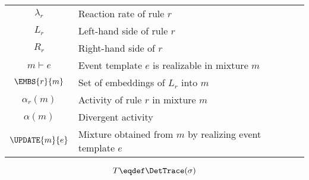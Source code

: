 
\medskip

\begin{center}
\def\arraystretch{1.5}
\begin{tabular}{cp{6cm}}
$\lambda_r$ & Reaction rate of rule $r$ \\
$L_r$ & Left-hand side of rule $r$ \\
$R_r$ & Right-hand side of $r$ \\
$m \vdash e$ & Event template $e$ is realizable in mixture $m$ \\
$\EMBS{r}{m}$ & Set of embeddings of $L_r$ into $m$ \\
$\alpha_r(m)$ & Activity of rule $r$ in mixture $m$ \\
$\alpha(m)$ & Divergent activity \\
$\UPDATE{m}{e}$ & Mixture obtained from $m$ by realizing event template $e$ \\
\end{tabular}
\end{center}


\[ T \eqdef \DetTrace(\sigma) \]

\newcommand\sbullet[1][.5]{\mathbin{\vcenter{\hbox{\scalebox{#1}{$\bullet$}}}}}
\newcommand{\Sep}{$\ \ \sbullet[0.5] \ \ $}


